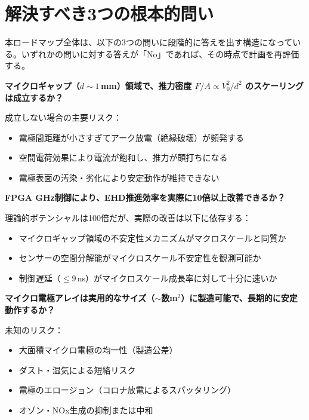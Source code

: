 \documentclass[12pt,a4paper]{ltjsarticle}
\begin{document}
\newpage
\section{解決すべき3つの根本的問い}

本ロードマップ全体は、以下の3つの問いに段階的に答えを出す構造になっている。いずれかの問いに対する答えが「No」であれば、その時点で計画を再評価する。

\begin{keybox}
\textbf{マイクロギャップ（$d \sim 1$\,mm）領域で、推力密度 $F/A \propto V_0^2/d^2$ のスケーリングは成立するか？}

成立しない場合の主要リスク：
\begin{itemize}[leftmargin=2em]
  \item 電極間距離が小さすぎてアーク放電（絶縁破壊）が頻発する
  \item 空間電荷効果により電流が飽和し、推力が頭打ちになる
  \item 電極表面の汚染・劣化により安定動作が維持できない
\end{itemize}
\end{keybox}

\begin{keybox}
\textbf{FPGA GHz制御により、EHD推進効率を実際に10倍以上改善できるか？}

理論的ポテンシャルは100倍だが、実際の改善は以下に依存する：
\begin{itemize}[leftmargin=2em]
  \item マイクロギャップ領域の不安定性メカニズムがマクロスケールと同質か
  \item センサーの空間分解能がマイクロスケール不安定性を観測可能か
  \item 制御遅延（$\leq 9$\,ns）がマイクロスケール成長率に対して十分に速いか
\end{itemize}
\end{keybox}

\begin{keybox}
\textbf{マイクロ電極アレイは実用的なサイズ（$\sim$数m$^2$）に製造可能で、長期的に安定動作するか？}

未知のリスク：
\begin{itemize}[leftmargin=2em]
  \item 大面積マイクロ電極の均一性（製造公差）
  \item ダスト・湿気による短絡リスク
  \item 電極のエロージョン（コロナ放電によるスパッタリング）
  \item オゾン・NOx生成の抑制または中和
\end{itemize}
\end{keybox}
\end{document}
